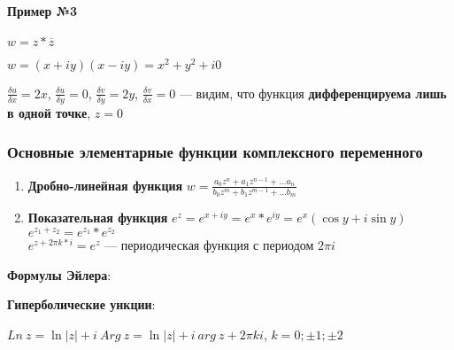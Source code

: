 \documentclass{article}
\begin{document}
\paragraph{Пример №3}

$w = z * \overline{z}$

$w = (x + iy) (x - iy) = x^2 + y^2 + i 0$

$\frac{\delta u}{\delta x} = 2 x$, $\frac{\delta u}{\delta y} = 0$, $\frac{\delta v}{\delta y} = 2 y$, $\frac{\delta v}{\delta x} = 0$ — видим, что функция \textbf{дифференцируема лишь в одной точке}, $z = 0$

\subsubsection{Основные элементарные функции комплексного переменного}

\begin{enumerate}
    \item \textbf{Дробно-линейная функция} $w = \frac{a_0 z^{n} + a_1 z^{n - 1} + \dots a_{n}}{b_0 z^{m} + b_1 z^{m - 1} + \dots b_{m}}$
    \item \textbf{Показательная функция} $e^{z} = e^{x + i y} = e^{x} * e^{i y} = e^{x} (\cos y + i \sin y)$ \\
    $e^{z_1 + z_2} = e^{z_1} * e^{z_2}$ \\
    $e^{z + 2 \pi k * i} = e^{z}$ — периодическая функция с периодом $2 \pi i$
\end{enumerate}

\textbf{Формулы Эйлера}:
\begin{multienumerate}
\end{multienumerate}

\textbf{Гиперболические ункции}:
\begin{multienumerate}
\end{multienumerate}

$Ln \ z = \ln |z| + i \ Arg \ z = \ln |z| + i \ arg \ z + 2 \pi k i$, $k = 0; \pm 1; \pm 2$
\end{document}
